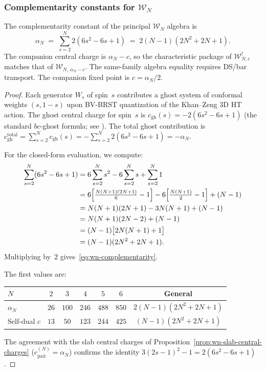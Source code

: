 \subsubsection{Complementarity constants for $\mathcal{W}_N$}
\label{subsubsec:wn-complementarity}

\begin{proposition}
\label{prop:wn-complementarity}
%
%
The complementarity constant of the principal $\mathcal{W}_N$
algebra is
\begin{equation}
\label{eq:wn-complementarity}
\alpha_N
\;=\; \sum_{s=2}^{N} 2(6s^2 - 6s + 1)
\;=\; 2(N-1)(2N^2 + 2N + 1).
\end{equation}
The companion central charge is $\alpha_N-c$, so the characteristic
package of $\mathcal{W}_{N,c}^!$ matches that of
$\mathcal{W}_{N,\,\alpha_N-c}$. The same-family algebra equality
requires DS/bar transport. The companion fixed point is
$c=\alpha_N/2$.
\end{proposition}

\begin{proof}
Each generator $W_s$ of spin~$s$ contributes a ghost system of
conformal weights $(s, 1-s)$ upon BV-BRST quantization of the
Khan--Zeng 3D HT action. The ghost central charge for
spin~$s$ is $c_{\mathrm{gh}}(s) = -2(6s^2 - 6s + 1)$
(the standard $bc$-ghost formula; see \cite{FMS86}).
The total ghost contribution is
$c_{\mathrm{gh}}^{\mathrm{total}}
= \sum_{s=2}^N c_{\mathrm{gh}}(s)
= -\sum_{s=2}^N 2(6s^2 - 6s + 1)
= -\alpha_N$.

For the closed-form evaluation, we compute:
\begin{align*}
\sum_{s=2}^{N}(6s^2 - 6s + 1)
&= 6\sum_{s=2}^{N} s^2 - 6\sum_{s=2}^{N} s
 + \sum_{s=2}^{N} 1 \\
&= 6\Bigl[\tfrac{N(N+1)(2N+1)}{6} - 1\Bigr]
 - 6\Bigl[\tfrac{N(N+1)}{2} - 1\Bigr]
 + (N-1) \\
&= N(N+1)(2N+1) - 3N(N+1) + (N-1) \\
&= N(N+1)(2N-2) + (N-1) \\
&= (N-1)\bigl[2N(N+1) + 1\bigr] \\
&= (N-1)(2N^2 + 2N + 1).
\end{align*}
Multiplying by~$2$ gives~\eqref{eq:wn-complementarity}.

The first values are:
\begin{center}
\renewcommand{\arraystretch}{1.2}
\begin{tabular}{lcccccc}
\toprule
$N$ & $2$ & $3$ & $4$ & $5$ & $6$ & General \\
\midrule
$\alpha_N$ & $26$ & $100$ & $246$ & $488$ & $850$
 & $2(N-1)(2N^2+2N+1)$ \\
Self-dual $c$ & $13$ & $50$ & $123$ & $244$ & $425$
 & $(N-1)(2N^2+2N+1)$ \\
\bottomrule
\end{tabular}
\end{center}
The agreement with the slab central charges of
Proposition~\ref{prop:wn-slab-central-charges}
($c_{\mathrm{pair}}^{(N)} = \alpha_N$)
confirms the identity $3(2s-1)^2 - 1 = 2(6s^2 - 6s + 1)$.
\end{proof}

